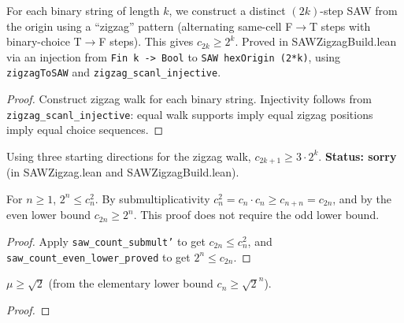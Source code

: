 \begin{lemma}\label{lem:saw_even_lower}
\leanok
{}
  For each binary string of length $k$, we construct a distinct $(2k)$-step SAW
  from the origin using a ``zigzag'' pattern (alternating same-cell F$\to$T steps
  with binary-choice T$\to$F steps). This gives $c_{2k} \geq 2^k$.
  Proved in SAWZigzagBuild.lean via an injection from \texttt{Fin k -> Bool}
  to \texttt{SAW hexOrigin (2*k)}, using \texttt{zigzagToSAW} and
  \texttt{zigzag\_scanl\_injective}.
\end{lemma}
\begin{proof}
\leanok
{}
  Construct zigzag walk for each binary string. Injectivity follows from
  \texttt{zigzag\_scanl\_injective}: equal walk supports imply equal
  zigzag positions imply equal choice sequences.
\end{proof}

\begin{lemma}\label{lem:saw_odd_lower}
  Using three starting directions for the zigzag walk,
  $c_{2k+1} \geq 3 \cdot 2^k$.
  \textbf{Status: sorry} (in SAWZigzag.lean and SAWZigzagBuild.lean).
\end{lemma}

\begin{lemma}[$2^n \leq c_n^2$]\label{lem:saw_sq_lower}
\leanok
{}
  For $n \geq 1$, $2^n \leq c_n^2$.
  By submultiplicativity $c_n^2 = c_n \cdot c_n \geq c_{n+n} = c_{2n}$,
  and by the even lower bound $c_{2n} \geq 2^n$.
  This proof does not require the odd lower bound.
\end{lemma}
\begin{proof}
\leanok
{}
  Apply \texttt{saw\_count\_submult'} to get $c_{2n} \leq c_n^2$,
  and \texttt{saw\_count\_even\_lower\_proved} to get $2^n \leq c_{2n}$.
\end{proof}

\begin{theorem}\label{thm:cc_ge_sqrt2}
\leanok
{}
  $\mu \geq \sqrt{2}$ (from the elementary lower bound $c_n \geq \sqrt{2}^n$).
\end{theorem}
\begin{proof}
\leanok
\end{proof}


